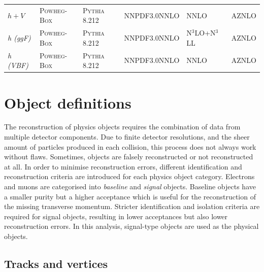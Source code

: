 \begin{table}
{\begin{tabular} {llllll}
	$h+V$ & \textsc{Powheg-Box} & \textsc{Pythia} 8.212 & NNPDF3.0NNLO & NNLO~\cite{deFlorian:2016spz} & AZNLO \\
	\textit{h (ggF)} & \textsc{Powheg-Box} & \textsc{Pythia} 8.212 & NNPDF3.0NNLO & N$^3$LO+N$^3$LL~\cite{deFlorian:2016spz} & AZNLO \\
	\textit{h (VBF)} & \textsc{Powheg-Box} & \textsc{Pythia} 8.212 & NNPDF3.0NNLO & NNLO~\cite{deFlorian:2016spz} & AZNLO \\
	\bottomrule
	\end{tabular}}\vspace{3mm}
	\label{tab:mc_generators}   
\end{table}

\section{Object definitions}

The reconstruction of physics objects requires the combination of data from multiple detector components. Due to finite detector resolutions, and the sheer amount of particles produced in each collision, this process does not always work without flaws. Sometimes, objects are falsely reconstructed or not reconstructed at all. In order to minimise reconstruction errors, different identification and reconstruction criteria are introduced for each physics object category. Electrons and muons are categorised into \textit{baseline} and \textit{signal} objects. Baseline objects have a smaller purity but a higher acceptance which is \eg useful for the reconstruction of the missing transverse momentum. Stricter identification and isolation criteria are required for signal objects, resulting in lower acceptances but also lower reconstruction errors. In this analysis, signal-type objects are used as the physical objects.

\subsection{Tracks and vertices}\label{sec:reco_tracks}

